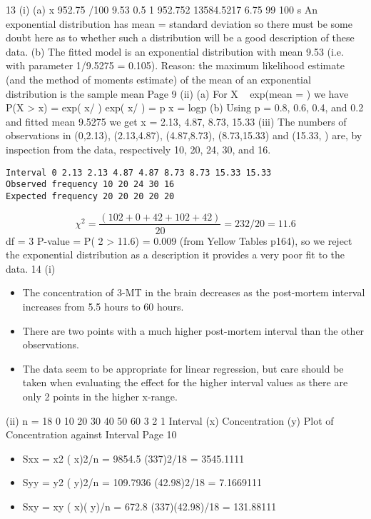 \documentclass[a4paper,12pt]{article}
\begin{document}
13 (i) (a) x 952.75 /100 9.53
0.5
1 952.752
13584.5217 6.75
99 100
s
An exponential distribution has mean = standard deviation so there must be some doubt here as to whether such a distribution will be a good description of these data.
(b) The fitted model is an exponential distribution with mean 9.53 
(i.e. with parameter 1/9.5275 = 0.105).
Reason: the maximum likelihood estimate (and the method of moments estimate) of the mean of an exponential distribution is the sample mean
Page 9
(ii) (a) For X ~ exp(mean = ) we have P(X > x) = exp( x/ )
exp( x/ ) = p x = logp
(b) Using p = 0.8, 0.6, 0.4, and 0.2 and fitted mean 9.5275
we get x = 2.13, 4.87, 8.73, 15.33
(iii) The numbers of observations in (0,2.13), (2.13,4.87), (4.87,8.73), (8.73,15.33)
and (15.33, ) are, by inspection from the data, respectively 10, 20, 24, 30,
and 16.
\begin{verbatim}
Interval 0 2.13 2.13 4.87 4.87 8.73 8.73 15.33 15.33
Observed frequency 10 20 24 30 16
Expected frequency 20 20 20 20 20
\end{verbatim}
\[\chi^2 = \frac{(102 + 0 + 42 + 102 + 42)}{20} = 232/20 = 11.6\]
df = 3
P-value = P( 2 > 11.6) = 0.009 (from Yellow Tables p164), so we reject the exponential distribution as a description it provides a very poor fit to the data.
14 (i)
\begin{itemize}
    \item The concentration of 3-MT in the brain decreases as the post-mortem interval increases from 5.5 hours to 60 hours.
    \item There are two points with a much higher post-mortem interval than the other observations.
\item The data seem to be appropriate for linear regression, but care should be taken when evaluating the effect for the higher interval values as there are only 2 points in the higher x-range.
\end{itemize}

(ii) n = 18
0 10 20 30 40 50 60
3
2
1
Interval (x)
Concentration (y)
Plot of Concentration against Interval
Page 10
\begin{itemize}
    \item Sxx = x2 ( x)2/n
= 9854.5 (337)2/18
= 3545.1111
    \item Syy = y2 ( y)2/n
= 109.7936 (42.98)2/18
= 7.1669111
    \item Sxy = xy ( x)( y)/n
= 672.8 (337)(42.98)/18
= 131.88111
\end{itemize}
\end{document}
